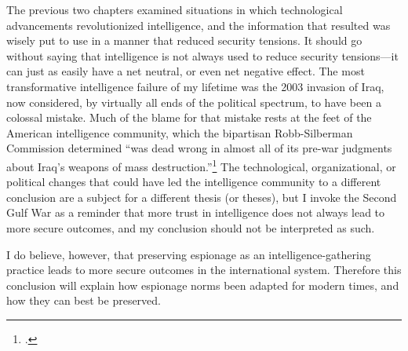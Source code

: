 \documentclass{report}
\begin{document}
The previous two chapters examined situations in which technological advancements revolutionized intelligence, and the information that resulted was wisely put to use in a manner that reduced security tensions. It should go without saying that intelligence is not always used to reduce security tensions---it can just as easily have a net neutral, or even net negative effect. The most transformative intelligence failure of my lifetime was the 2003 invasion of Iraq, now considered, by virtually all ends of the political spectrum, to have been a colossal mistake. Much of the blame for that mistake rests at the feet of the American intelligence community, which the bipartisan Robb-Silberman Commission determined ``was dead wrong in almost all of its pre-war judgments about Iraq's weapons of mass destruction.''\footcite{commission_on_the_intelligence_capabilities_of_the_united_states_regarding_wmds_final_2005} The technological, organizational, or political changes that could have led the intelligence community to a different conclusion are a subject for a different thesis (or theses), but I invoke the Second Gulf War as a reminder that more trust in intelligence does not always lead to more secure outcomes, and my conclusion should not be interpreted as such.

I do believe, however, that preserving espionage as an intelligence-gathering practice leads to more secure outcomes in the international system. Therefore this conclusion will explain how espionage norms been adapted for modern times, and how they can best be preserved.

\end{document}
